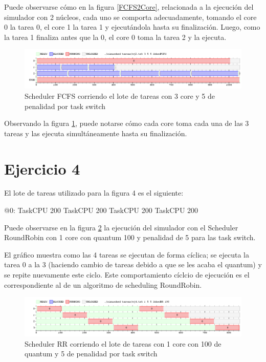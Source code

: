 \documentclass[a4paper,10pt,twoside]{article}
\newenvironment{pseudo}[1][]{%
    \vspace{0.5em}%
    \begin{algorithmic}%
}
{%
    \end{algorithmic}%
    \vspace{0.5em}%
}
\begin{document}
Puede observarse cómo en la figura \ref{FCFS2Core}, relacionada a la ejecución del simulador con 2 núcleos, cada uno se comporta adecuadamente, tomando el core 0 la tarea 0, el core 1 la tarea 1 y ejecutándola hasta su finalización. Luego, como la tarea 1 finaliza antes que la 0, el core 0 toma la tarea 2 y la ejecuta.

\begin{figure}[ht!]
\centering
\includegraphics[width=175mm]{../ejercicio2/FCFS3Core.png}
\caption{Scheduler FCFS corriendo el lote de tareas con 3 core y 5 de penalidad por task switch}
\label{FCFS3Core}
\end{figure}

Observando la figura \ref{FCFS3Core}, puede notarse cómo cada core toma cada una de las 3 tareas y las ejecuta simultáneamente hasta su finalización.



\section{Ejercicio 4}
El lote de tareas utilizado para la figura 4 es el siguiente:
\begin{pseudo}
	\State @0:
	\State TaskCPU 200
	\State TaskCPU 200
	\State TaskCPU 200
	\State TaskCPU 200
\end{pseudo}

Puede observarse en la figura \ref{SchedRR1Core} la ejecución del simulador con el Scheduler RoundRobin con 1 core con quantum 100 y penalidad de 5 para las task switch.

El gráfico muestra como las 4 tareas se ejecutan de forma cíclica; se ejecuta la tarea 0 a la 3 (haciendo cambio de tareas debido a que se les acaba el quantum) y se repite nuevamente este ciclo. Este comportamiento cíclcio de ejecución es el correspondiente al de un algoritmo de scheduling RoundRobin.

\begin{figure}[ht!]
\centering
\includegraphics[width=175mm]{../ejercicio4/SchedRR1Core.png}
\caption{Scheduler RR corriendo el lote de tareas con 1 core con 100 de quantum y 5 de penalidad por task switch}
\label{SchedRR1Core}
\end{figure}
\end{document}

